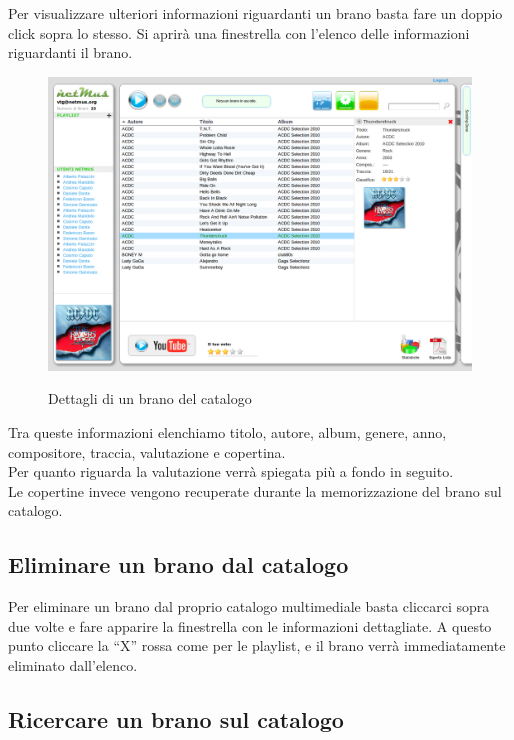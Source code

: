 Per visualizzare ulteriori informazioni riguardanti un brano basta fare un
doppio click sopra lo stesso. Si aprir\`a una finestrella con l'elenco delle
informazioni riguardanti il brano.\\
\begin{figure}[htbp]
  \centering
  \includegraphics[width=15cm]{img/MU/info_song.png}\\
\caption{Dettagli di un brano del catalogo}
\end{figure}

Tra queste informazioni elenchiamo titolo, autore, album, genere, anno,
compositore, traccia, valutazione e copertina.\\
Per quanto riguarda la valutazione verr\`a spiegata pi\`u a fondo in seguito.\\
Le copertine invece vengono recuperate durante la memorizzazione del brano sul
catalogo.

\subsection*{Eliminare un brano dal catalogo}

Per eliminare un brano dal proprio catalogo multimediale basta cliccarci sopra
due volte e fare apparire la finestrella con le informazioni dettagliate. A
questo punto cliccare la ``X'' rossa come per le playlist, e il brano verr\`a
immediatamente eliminato dall'elenco.

\subsection*{Ricercare un brano sul catalogo}

